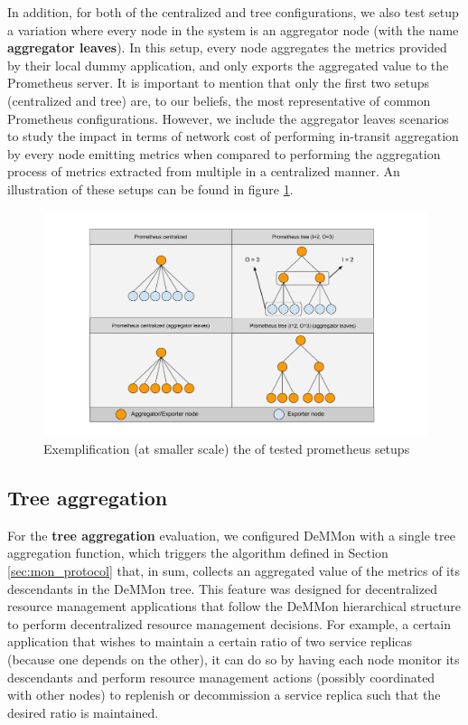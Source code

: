 In addition, for both of the centralized and tree configurations, we also test setup a variation where every node in the system is an aggregator node (with the name \textbf{aggregator leaves}). In this setup, every node aggregates the metrics provided by their local dummy application, and only exports the aggregated value to the Prometheus server. It is important to mention that only the first two setups (centralized and tree) are, to our beliefs, the most representative of common Prometheus configurations.  However, we include the aggregator leaves scenarios to study the impact in terms of network cost of performing in-transit aggregation by every node emitting metrics when compared to performing the aggregation process of metrics extracted from multiple in a centralized manner. An illustration of these setups can be found in figure \ref{fig:sec:eval_prom_setups}.

\begin{figure}
    \centering
    \includegraphics[width=\linewidth]{Chapters/evaluation/figures/aggregation/Prometheus setups.pdf}
    \caption{Exemplification (at smaller scale) the of tested prometheus setups}
    \label{fig:sec:eval_prom_setups}
\end{figure}

\subsection{Tree aggregation}

For the \textbf{tree aggregation} evaluation, we configured DeMMon with a single tree aggregation function, which triggers the algorithm defined in Section \ref{sec:mon_protocol} that, in sum, collects an aggregated value of the metrics of its descendants in the DeMMon tree. This feature was designed for decentralized resource management applications that follow the DeMMon hierarchical structure to perform decentralized resource management decisions. For example, a certain application that wishes to maintain a certain ratio of two service replicas (because one depends on the other), it can do so by having each node monitor its descendants and perform resource management actions (possibly coordinated with other nodes) to replenish or decommission a service replica such that the desired ratio is maintained.


